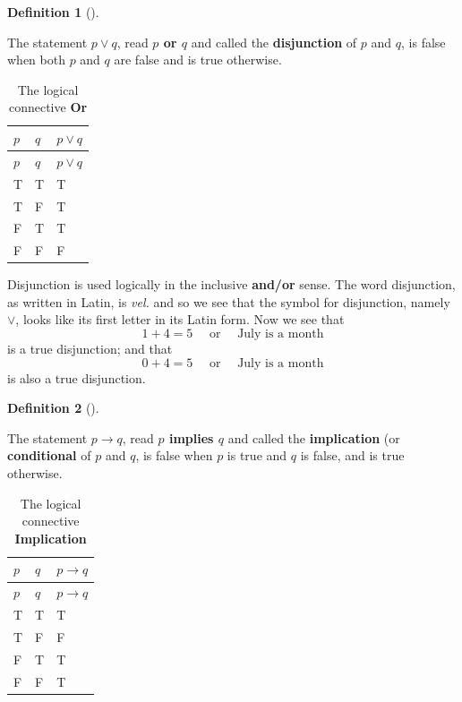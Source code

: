 \documentclass[
  letterpaper,
  10pt,
  reqno,
  twopage,
  openany]{book}
\theoremstyle{plain}
\theoremstyle{definition}
\theoremstyle{definition}
\newtheorem{definition}{Definition}[chapter]
\theoremstyle{definition}
\theoremstyle{plain}
\theoremstyle{plain}
\theoremstyle{remark}
\begin{document}
\leavevmode{}%
\begin{definition}[]\label{def-disjunction}

The statement \(p\lor q\), read \textbf{\(p\) or \(q\)} and called the
 \textbf{disjunction} of \(p\) and \(q\), is false
when both \(p\) and \(q\) are false and is true otherwise.

\end{definition}

\hypertarget{tbl-or}{}
\begin{longtable}[]{@{}lll@{}}
\caption{\label{tbl-or}The logical connective
\textbf{Or}}\tabularnewline
\toprule()
\(p\) & \(q\) & \(p\lor q\) \\
\midrule()
\endfirsthead
\toprule()
\(p\) & \(q\) & \(p\lor q\) \\
\midrule()
\endhead
T & T & T \\
T & F & T \\
F & T & T \\
F & F & F \\
\bottomrule()
\end{longtable}

Disjunction is used logically in the inclusive \textbf{and/or} sense.
The word disjunction, as written in Latin, is \emph{vel.} and so we see
that the symbol for disjunction, namely \(\lor\), looks like its first
letter in its Latin form. Now we see that \[
1+4=5 \quad \text{ or} \quad \text{ July is a month}
\] is a true disjunction; and that \[
0+4=5 \quad \text{ or} \quad \text{ July is a month}
\] is also a true disjunction.

\leavevmode{}%
\begin{definition}[]\label{def-implication}

The statement \(p\rightarrow q\), read \textbf{\(p\) implies \(q\)} and
called the  \textbf{implication} (or
 \textbf{conditional} of \(p\) and \(q\), is false
when \(p\) is true and \(q\) is false, and is true otherwise.

\end{definition}

\hypertarget{tbl-implication}{}
\begin{longtable}[]{@{}lll@{}}
\caption{\label{tbl-implication}The logical connective
\textbf{Implication}}\tabularnewline
\toprule()
\(p\) & \(q\) & \(p\rightarrow q\) \\
\midrule()
\endfirsthead
\toprule()
\(p\) & \(q\) & \(p\rightarrow q\) \\
\midrule()
\endhead
T & T & T \\
T & F & F \\
F & T & T \\
F & F & T \\
\bottomrule()
\end{longtable}
\end{document}
